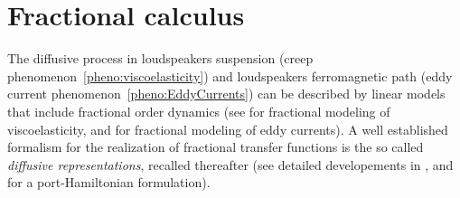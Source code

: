 \documentclass[10pt,a4paper]{article}
\begin{document}
\section{Fractional calculus}
\label{sec:fractional_calculus}
%
The diffusive process in loudspeakers suspension (creep phenomenon~\ref{pheno:viscoelasticity}) and loudspeakers ferromagnetic path (eddy current phenomenon~\ref{pheno:EddyCurrents}) can be described by linear models that include fractional order dynamics (see \cite{koeller1984applications, lewandowski2010identification, hu2011modal, Holm2013621} for fractional modeling of viscoelasticity, and \cite{schafer2008modelling, laudebat2003modelisation, rumeau2009modelisation} for fractional modeling of eddy currents).
%
A well established formalism for the realization of fractional transfer functions is the so called \emph{diffusive representations}, recalled thereafter (see detailed developements in \cite{helie2006representations,helie2006diffusive}, and \cite{le2012diffusive} for a port-Hamiltonian formulation).
%
%
%
%
%
%
%
%
%
%
%
%
%
%
%
%
%
%
%
%
%
%
\end{document}
